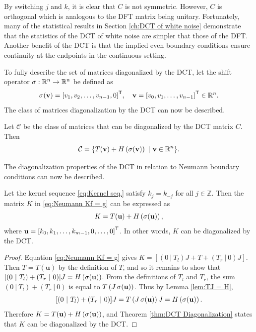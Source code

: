 By switching $j$ and $k$, it is clear that $C$ is not symmetric. However, $C$ is orthogonal which is analogous to the DFT matrix being unitary. Fortunately, many of the statistical results in Section \ref{ch:DCT of white noise} demonstrate that the statistics of the DCT of white noise are simpler that those of the DFT. Another benefit of the DCT is that the implied even boundary conditions ensure continuity at the endpoints in the continuous setting. \par
To fully describe the set of matrices diagonalized by the DCT, let the shift operator $\operatorname{\sigma}: \mathbb{R}^n \rightarrow \mathbb{R}^n$ be defined as
\[\operatorname{\sigma}(\mathbf{v}) = {[v_1,v_2,\ldots,v_{n-1},0]}^\mathsf{T}, \quad \mathbf{v} = {[v_0,v_1,\ldots,v_{n-1}]}^\mathsf{T} \in \mathbb{R}^n.\] 
The class of matrices diagonalization by the DCT can now be described.
\begin{theorem}
\label{thm:DCT Diagonalization}
Let $\mathcal{C}$ be the class of matrices that can be diagonalized by the DCT matrix $C$. Then
\[\mathcal{C} = \{T(\mathbf{v}) + H\left(\operatorname{\sigma}(\mathbf{v})\right) ~|~ \mathbf{v} \in \mathbb{R}^n\}.\]
\end{theorem}
The diagonalization properties of the DCT in relation to Neumann boundary conditions can now be described.
\begin{theorem}
\label{thm:Neumann Diagonalization}
Let the kernel sequence \eqref{eq:Kernel seq.} satisfy $k_j = k_{-j}$ for all $j \in \mathbb{Z}$. Then the matrix $K$ in \eqref{eq:Neumann Kf = g} can be expressed as
\[K = T(\mathbf{u}) + H\left(\operatorname{\sigma}(\mathbf{u})\right),\]
where $\mathbf{u} = {[k_0,k_1,\ldots,k_{m-1},0,\ldots,0]}^\mathsf{T}$. In other words, $K$ can be diagonalized by the DCT.
\end{theorem}
\begin{proof}
Equation \eqref{eq:Neumann Kf = g} gives $K = [(0~|~T_{l})J + T + (T_{r}~|~0)J]$. Then $T = T(\mathbf{u})$ by the definition of $T$, and so it remains to show that $[(0~|~T_{l}) + (T_{r}~|~0)]J = H\left(\operatorname{\sigma}(\mathbf{u})\right)$. From the definitions of $T_{l}$ and $T_{r}$, the sum $(0~|~T_{l}) + (T_{r}~|~0)$ is equal to $T\left(J\operatorname{\sigma}(\mathbf{u})\right)$. Thus by Lemma \ref{lem:TJ = H},
\[[(0~|~T_{l}) + (T_{r}~|~0)]J = T\left(J\operatorname{\sigma}(\mathbf{u})\right)J = H\left(\operatorname{\sigma}(\mathbf{u})\right).\]
Therefore $K = T(\mathbf{u}) + H\left(\operatorname{\sigma}(\mathbf{u})\right)$, and Theorem \ref{thm:DCT Diagonalization} states that $K$ can be diagonalized by the DCT. 
\end{proof}

